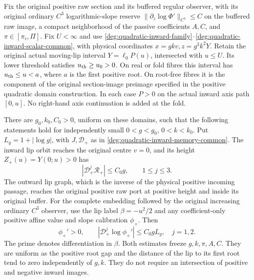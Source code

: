 \begin{corollary}
\label{deg:cor-positive-compact-suppliers}
Fix the original positive raw section and its buffered regular observer,
with its original ordinary \(C^3\) logarithmic-slope reserve
\(\|\partial_z\log\Phi'\|_{C^1}\le C\) on the buffered raw image,
a compact neighborhood of the passive coefficients \(A,C\), and
\(\pi\in[\pi_\flat,\Pi]\). Fix \(U<\infty\) and use
\eqref{deg:quadratic-inward-family}--\eqref{deg:quadratic-inward-scalar-common},
with physical coordinates \(x=gkv,z=g^3k^2Y\).
Retain the original actual moving-lip interval \(Y=\ell_0P(u)\),
intersected with \(u\le U\). Its lower threshold satisfies
\(u_{\rm th}\ge u_0>0\). On real or fold fibres this interval has
\(u_{\rm th}\le u<a\), where \(a\) is the first positive root.
On root-free fibres it is the component of the original section-image
preimage specified in the positive quadratic domain construction.
In each case \(P>0\) on the actual inward axis path \([0,u]\).
No right-hand axis continuation is added at the fold.

There are \(g_0,k_0,C_0>0\), uniform on these domains, such that
the following statements hold for independently small
\(0<g<g_0\), \(0<k<k_0\). Put \(L_g=1+|\log g|\), with \(J,\mathcal D_+\) as in
\eqref{deg:quadratic-inward-memory-common}.
The inward lip orbit reaches the original centre \(v=0\), and its
height \(Z_+(u)=Y(0;u)>0\) has
\begin{equation}\label{deg:positive-compact-central-jets}
 |\mathcal D_+^j\mathcal R_+|\le C_0g,\qquad1\le j\le3.
\end{equation}
The outward lip graph, which is the inverse of the physical positive
incoming passage, reaches the original positive raw port at positive
height and inside its original buffer. For the complete embedding
followed by the original increasing ordinary \(C^3\) observer, use
the lip label \(\beta=-u^2/2\) and any coefficient-only positive
affine value and slope calibration \(\phi_+\). Then
\begin{equation}
 \phi_+'>0,\qquad
 |\mathcal D_+^j\log\phi_+'|\le C_0gL_g,\quad j=1,2.
 \label{deg:positive-compact-outer-jets}
\end{equation}
The prime denotes differentiation in \(\beta\).
Both estimates freeze \(g,k,\pi,A,C\). They are uniform as the
positive root gap and the distance of the lip to its first root tend
to zero independently of \(g,k\). They do not require an intersection
of positive and negative inward images.
\end{corollary}

